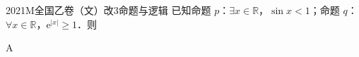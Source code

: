 
\begin{problem}{2021}{M}{全国乙卷（文）改}{3}{命题与逻辑}
已知命题 $ p $：$ \exists x\in\mathbb{R} $，$ \sin x<1 $；命题 $ q $：$ \forall x\in\mathbb{R} $，$ \mathrm{e}^{|x|}\geq 1 $．则
\begin{choices}
\end{choices}
\end{problem}

\begin{answer}
A
\end{answer}

\begin{solutions}

\end{solutions}